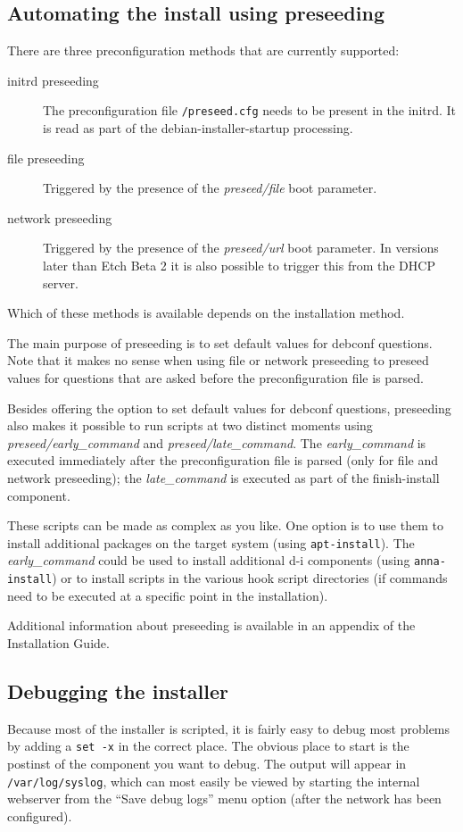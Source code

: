 \documentclass[a4paper,10pt]{article}
\begin{document}
\subsection{Automating the install using preseeding}
There are three preconfiguration methods that are currently supported: 

\begin{description}
\item[initrd preseeding]
The preconfiguration file \texttt{/preseed.cfg} needs to be present in the initrd. It is read as part of the debian-installer-startup processing. 
\item[file preseeding]
Triggered by the presence of the \textit{preseed/file} boot parameter.
\item[network preseeding]
Triggered by the presence of the \textit{preseed/url} boot parameter. In versions later than Etch Beta 2 it is also possible to trigger this from the DHCP server. 
\end{description}

Which of these methods is available depends on the installation method. 

The main purpose of preseeding is to set default values for debconf questions. Note that it makes no sense when using file or network preseeding to preseed values for questions that are asked before the preconfiguration file is parsed. 

Besides offering the option to set default values for debconf questions, preseeding also makes it possible to run scripts at two distinct moments using \textit{preseed/early\_command} and \textit{preseed/late\_command}. The \textit{early\_command} is executed immediately after the preconfiguration file is parsed (only for file and network preseeding); the \textit{late\_command} is executed as part of the finish-install component. 

These scripts can be made as complex as you like. One option is to use them to install additional packages on the target system (using \texttt{apt-install}). The \textit{early\_command} could be used to install additional d-i components (using \texttt{anna-install}) or to install scripts in the various hook script directories (if commands need to be executed at a specific point in the installation). 

Additional information about preseeding is available in an appendix of the Installation Guide. 


\subsection{Debugging the installer}
Because most of the installer is scripted, it is fairly easy to debug most problems by adding a \texttt{set -x} in the correct place. The obvious place to start is the postinst of the component you want to debug. The output will appear in \texttt{/var/log/syslog}, which can most easily be viewed by starting the internal webserver from the “Save debug logs” menu option (after the network has been configured). 
\end{document}
